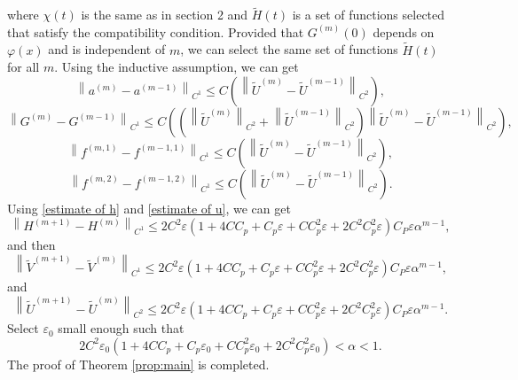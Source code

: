 \documentclass[a4paper,reqno,11pt]{amsart}
\numberwithin{equation}{section} %
\begin{document}
where $\chi (t)$ is the same as in section 2 and $\widetilde{H}(t)$ is a set of functions selected that satisfy the compatibility condition.
Provided that $G^{\left( m \right)}\left( 0 \right)$ depends on $\varphi (x)$ and is independent of $m$, we can select the same set of functions $\widetilde{H}(t)$ for all $m$.
Using the inductive assumption, we can get
$$
\left\| a^{\left( m \right)}-a^{\left( m-1 \right)} \right\| _{C^1}\le C\left( \left\| \tilde{U}^{\left( m \right)}-\tilde{U}^{\left( m-1 \right)} \right\| _{C^2} \right) ,
$$
$$
\left\| G^{\left( m \right)}-G^{\left( m-1 \right)} \right\| _{C^1}\le C\left( \left( \left\| \tilde{U}^{\left( m \right)} \right\| _{C^2}+\left\| \tilde{U}^{\left( m-1 \right)} \right\| _{C^2} \right) \left\| \tilde{U}^{\left( m \right)}-\tilde{U}^{\left( m-1 \right)} \right\| _{C^2} \right) ,
$$
$$
\left\| f^{\left( m,1 \right)}-f^{\left( m-1,1 \right)} \right\| _{C^1}\le C\left( \left\| \tilde{U}^{\left( m \right)}-\tilde{U}^{\left( m-1 \right)} \right\| _{C^2} \right) ,
$$
$$
\left\| f^{\left( m,2 \right)}-f^{\left( m-1,2\right)} \right\| _{C^1}\le C\left( \left\| \tilde{U}^{\left( m \right)}-\tilde{U}^{\left( m-1 \right)} \right\| _{C^2} \right) .
$$
Using \eqref{estimate of h} and \eqref{estimate of u}, we can get
$$
\left\| H^{\left( m+1 \right)}-H^{\left( m \right)} \right\| _{C^1}\le 2C^2\varepsilon \left( 1+4CC_p+C_p\varepsilon +CC_{p}^{2}\varepsilon +2C^2C_{p}^{2}\varepsilon \right)C_P\varepsilon \alpha ^{m-1} ,
$$
and then
$$
\left\| \tilde{V}^{\left( m+1 \right)}-\tilde{V}^{\left( m \right)} \right\| _{C^1}\le 2C^2\varepsilon \left( 1+4CC_p+C_p\varepsilon +CC_{p}^{2}\varepsilon +2C^2C_{p}^{2}\varepsilon \right) C_P\varepsilon \alpha ^{m-1},
$$
and
$$
\left\| \tilde{U}^{\left( m+1 \right)}-\tilde{U}^{\left( m \right)} \right\| _{C^2}\le 2C^2\varepsilon \left( 1+4CC_p+C_p\varepsilon +CC_{p}^{2}\varepsilon +2C^2C_{p}^{2}\varepsilon \right) C_P\varepsilon \alpha ^{m-1}.
$$
Select $\varepsilon _0$ small enough such that
$$
2C^2\varepsilon _0 \left( 1+4CC_p+C_p\varepsilon _0 +CC_{p}^{2}\varepsilon _0 +2C^2C_{p}^{2}\varepsilon _0 \right) <\alpha <1.
$$
The proof of Theorem \ref{prop:main} is completed.
\end{document}
